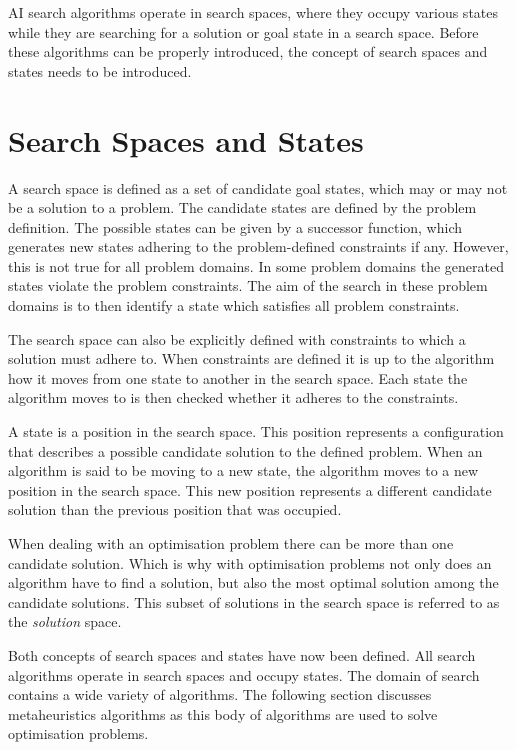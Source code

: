 \gls{AI} search algorithms operate in search spaces, where they occupy various states while they are searching for a solution or goal state in a search space. Before these algorithms can be properly introduced, the concept of search spaces and states needs to be introduced.

\section{Search Spaces and States}
A search space is defined as a set of candidate goal states, which may or may not be a solution to a problem\cite{AIModernApproach}. The candidate states are defined by the problem definition\cite{AIModernApproach}. The possible states can be given by a successor function, which generates new states adhering to the problem-defined constraints if any\cite{AIModernApproach}. However, this is not true for all problem domains. In some problem domains the generated states violate the problem constraints. The aim of the search in these problem domains is to then identify a state which satisfies all problem constraints.

The search space can also be explicitly defined with constraints to which a solution must adhere to\cite{AIModernApproach}. When constraints are defined it is up to the algorithm how it moves from one state to another in the search space\cite{AIModernApproach}. Each state the algorithm moves to is then checked whether it adheres to the constraints\cite{AIModernApproach}.

A state is a position in the search space\cite{AIModernApproach}. This position represents a configuration that describes a possible candidate solution to the defined problem\cite{AIModernApproach}. When an algorithm is said to be moving to a new state, the algorithm moves to a new position in the search space\cite{AIModernApproach}. This new position represents a different candidate solution than the previous position that was occupied\cite{AIModernApproach}.

When dealing with an optimisation problem there can be more than one candidate solution\cite{AIModernApproach}. Which is why with optimisation problems not only does an algorithm have to find a solution, but also the most optimal solution among the candidate solutions\cite{AIModernApproach}. This subset of solutions in the search space is referred to as the \emph{solution} space.

Both concepts of search spaces and states have now been defined. All search algorithms operate in search spaces and occupy states. The domain of search contains a wide variety of algorithms. The following section discusses metaheuristics algorithms as this body of algorithms are used to solve optimisation problems.

